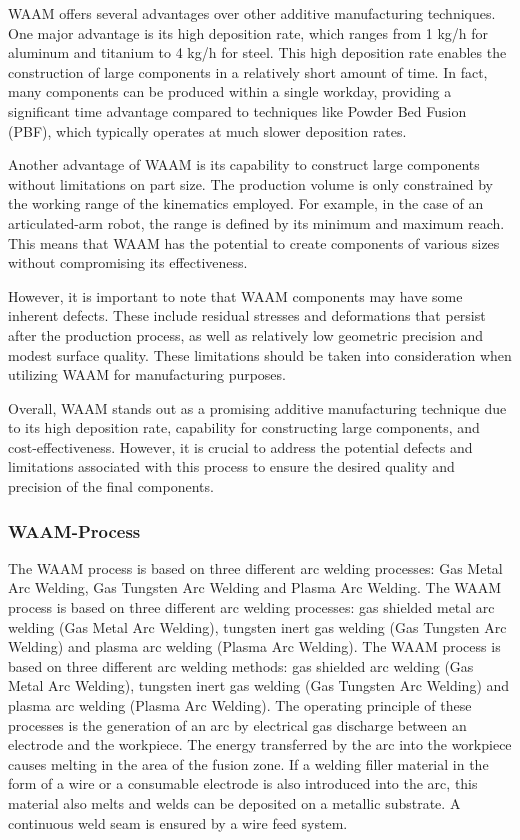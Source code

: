 WAAM offers several advantages over other additive manufacturing techniques. One major advantage is its high deposition rate, which ranges from 1 kg/h for aluminum and titanium to 4 kg/h for steel. This high deposition rate enables the construction of large components in a relatively short amount of time. In fact, many components can be produced within a single workday, providing a significant time advantage compared to techniques like Powder Bed Fusion (PBF), which typically operates at much slower deposition rates.

Another advantage of WAAM is its capability to construct large components without limitations on part size. The production volume is only constrained by the working range of the kinematics employed. For example, in the case of an articulated-arm robot, the range is defined by its minimum and maximum reach. This means that WAAM has the potential to create components of various sizes without compromising its effectiveness.

However, it is important to note that WAAM components may have some inherent defects. These include residual stresses and deformations that persist after the production process, as well as relatively low geometric precision and modest surface quality. These limitations should be taken into consideration when utilizing WAAM for manufacturing purposes.

Overall, WAAM stands out as a promising additive manufacturing technique due to its high deposition rate, capability for constructing large components, and cost-effectiveness. However, it is crucial to address the potential defects and limitations associated with this process to ensure the desired quality and precision of the final components.

\subsubsection{WAAM-Process}
The WAAM process is based on three different arc welding processes: Gas Metal Arc Welding, Gas Tungsten Arc Welding and Plasma Arc Welding. The WAAM process is based on three different arc welding processes: gas shielded metal arc welding (Gas Metal Arc Welding), tungsten inert gas welding (Gas Tungsten Arc Welding) and plasma arc welding (Plasma Arc Welding). The WAAM process is based on three different arc welding methods: gas shielded arc welding (Gas Metal Arc Welding), tungsten inert gas welding (Gas Tungsten Arc Welding) and plasma arc welding (Plasma Arc Welding). The operating principle of these processes is the generation of an arc by electrical gas discharge between an electrode and the workpiece. The energy transferred by the arc into the workpiece causes melting in the area of the fusion zone. If a welding filler material in the form of a wire or a consumable electrode is also introduced into the arc, this material also melts and welds can be deposited on a metallic substrate. A continuous weld seam is ensured by a wire feed system.

